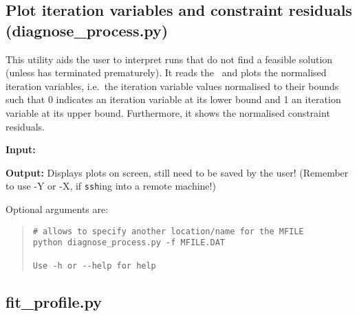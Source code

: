 \subsection{Plot iteration variables and constraint residuals (diagnose\_process.py)}

This utility aids the user to interpret \process\/ runs that do not find a feasible solution (unless \process\/ has terminated prematurely). It reads the \mfile\ and plots
the normalised iteration variables, i.e.\ the iteration variable values
normalised to their bounds such that 0 indicates an iteration variable at its
lower bound and 1 an iteration variable at its upper bound. Furthermore, it
shows the normalised constraint residuals.

\begin{description}
\item{\textbf{Input:}}
 \mfile
                                
\item{\textbf{Output:}}
  Displays plots on screen, still need to be saved by the user! (Remember to
  use -Y or -X, if \texttt{ssh}ing into a remote machine!)

\end{description}

Optional arguments are:
\begin{quote}
\begin{verbatim}
# allows to specify another location/name for the MFILE
python diagnose_process.py -f MFILE.DAT

Use -h or --help for help

\end{verbatim}
\end{quote}

\subsection{fit\_profile.py}

